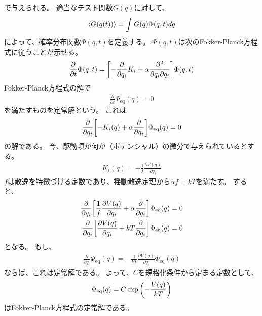 \documentclass[]{ltjsarticle}
\newcommand{\del}{\partial}
\begin{document}
で与えられる。
適当なテスト関数$G(q)$に対して、
\begin{align}
    \expval{G(q(t))}
    =
    \int G(q) \Phi(q,t) dq
\end{align}
によって、確率分布関数$\Phi(q,t)$を定義する。
$\Phi(q,t)$は次のFokker-Planck方程式に従うことが示せる。
\begin{align}
    \frac{\del}{\del t} \Phi(q,t)
    =
    \qty[
        -\frac{\del}{\del q_i}K_i + \alpha \frac{\del^2}{\del q_i \del q_i}
    ]
    \Phi(q,t)
\end{align}
Fokker-Planck方程式の解で
\begin{align}
    \frac{\del}{\del t} \Phi_\text{eq}(q) = 0
\end{align}
を満たすものを定常解という。
これは
\begin{align}
    \frac{\del}{\del q_i} 
    \qty[
        -K_i(q) + \alpha \frac{\del}{\del q_i}
    ]
    \Phi_\text{eq}(q) = 0
\end{align}
の解である。
今、駆動項が何か（ポテンシャル）の微分で与えられているとする。
\begin{align}
    K_i(q) = - \frac{1}{f} \frac{\del V(q)}{\del q_i}
\end{align}
$f$は散逸を特徴づける定数であり、揺動散逸定理から$\alpha f = k T$を満たす。
すると、
\begin{align}
    \frac{\del}{\del q_i} 
    \qty[
        \frac{1}{f} \frac{\del V(q)}{\del q_i} + \alpha \frac{\del}{\del q_i}
    ]
    \Phi_\text{eq}(q) &= 0 \\
    \frac{\del}{\del q_i} 
    \qty[
        \frac{\del V(q)}{\del q_i} + kT \frac{\del}{\del q_i}
    ]
    \Phi_\text{eq}(q) &= 0
\end{align}
となる。
もし、
\begin{align}
    \frac{\del}{\del q_i}\Phi_\text{eq}(q) 
    = 
    - \frac{1}{kT} \frac{\del V(q)}{\del q_i}\Phi_\text{eq}(q)
\end{align}
ならば、これは定常解である。
よって、$C$を規格化条件から定まる定数として、
\begin{align}
    \Phi_\text{eq}(q) = C \exp\qty(- \frac{V(q)}{kT})
\end{align}
はFokker-Planck方程式の定常解である。
    
\end{document}
